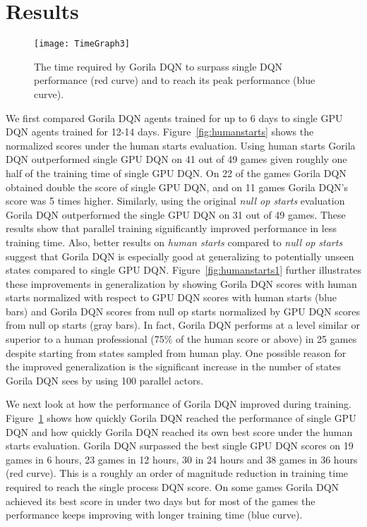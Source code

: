 
\section {Results}

\begin{figure}[ht]
	\vskip -0.1in
	\begin{center}
		\centerline{\texttt{[image: TimeGraph3]}}
		\caption{
			The time required by Gorila DQN to surpass single DQN performance (red curve) and to reach its peak performance (blue curve). 
		}
		\label{fig:time}
	\end{center}
	\vskip -0.2in
\end{figure}

We first compared Gorila DQN agents trained for up to 6 days to single GPU DQN agents trained for 12-14 days.
Figure~\ref{fig:humanstarts} shows the normalized scores under the human starts evaluation.
Using human starts Gorila DQN outperformed single GPU DQN on 41 out of 49 games given roughly one half of the training time of single GPU DQN.
On 22 of the games Gorila DQN obtained double the score of single GPU DQN, and on 11 games Gorila DQN's score was 5 times higher.
Similarly, using the original {\it null op starts} evaluation  Gorila DQN outperformed the single GPU DQN on 31 out of 49 games. 
These results show that parallel training significantly improved performance in less training time. Also, better results on {\it human starts} compared to {\it null op starts} suggest that Gorila DQN is especially good at generalizing to potentially unseen states compared to single GPU DQN.  Figure~\ref{fig:humanstarts1} further illustrates these improvements in generalization by showing Gorila DQN scores with human starts normalized with respect to GPU DQN scores with human starts (blue bars) and Gorila DQN scores from null op starts normalized by GPU DQN scores from null op starts (gray bars).
In fact, Gorila DQN performs at a level similar or superior to a human professional (75\% of the human score or above) in 25 games despite starting from states sampled from human play.
One possible reason for the improved generalization is the significant increase in the number of states Gorila DQN sees by using 100 parallel actors.


We next look at how the performance of Gorila DQN improved during training.
Figure~\ref{fig:time} shows how quickly Gorila DQN reached the performance of single GPU DQN and how quickly Gorila DQN reached its own best score under the human starts evaluation.
Gorila DQN surpassed the best single GPU DQN scores on 19 games in 6 hours, 23 games in 12 hours, 30 in 24 hours and 38 games in 36 hours (red curve).
This is a roughly an order of magnitude reduction in training time required to reach the single process DQN score.
On some games Gorila DQN achieved its best score in under two days but for most of the games the performance keeps improving with longer training time (blue curve).


